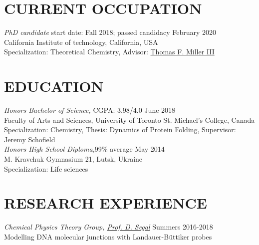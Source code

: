\documentclass[9pt, margin]{res}
\begin{document}
\begin{resume}

 
\section{CURRENT OCCUPATION}

{\sl PhD candidate} \hfill start date: Fall 2018; passed candidacy February 2020\\
California Institute of technology, California, USA\\
Specialization: Theoretical Chemistry, Advisor: \href{https://millergroup.caltech.edu/Miller_Group/people/}{Thomas F. Miller III}\\

\section{EDUCATION}

{\sl Honors Bachelor of Science,} \hfill CGPA: 3.98/4.0 \hfill June 2018 \\
Faculty of Arts and Sciences, University of Toronto St. Michael's College, Canada \\
Specialization: Chemistry, Thesis: Dynamics of Protein Folding, Supervisor: Jeremy Schofield\\

 
{\sl Honors High School Diploma,}\hfill 99\% average \hfill  May 2014\\
M. Kravchuk Gymnasium 21, Lutsk, Ukraine\\
Specialization: Life sciences\\
 
 
\section{RESEARCH EXPERIENCE}

{\sl Chemical Physics Theory Group, \href{http://www.chem.utoronto.ca/~dsegal/index.html}{Prof. D. Segal}} \hfill Summers 2016-2018 \\
Modelling DNA molecular junctions with Landauer-B\"uttiker probes


\end{resume}
\end{document}
